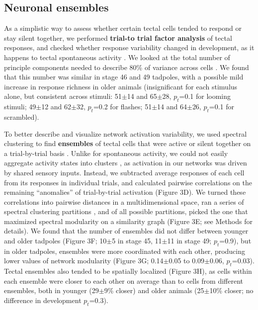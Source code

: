 \documentclass{article}
\begin{document}
\subsection*{Neuronal ensembles}

As a simplistic way to assess whether certain tectal cells tended to respond or stay silent together, we performed \textbf{trial-to trial factor analysis} of tectal responses, and checked whether response variability changed in development, as it happens to tectal spontaneous activity \citep{xu2011}. We looked at the total number of principle components needed to describe 80\% of variance across cells \citep{avitan2017spontaneous}. We found that this number was similar in stage 46 and 49 tadpoles, with a possible mild increase in response richness in older animals (insignificant for each stimulus alone, but consistent across stimuli: 51$\pm$14 and 65$\pm$28, $p_t$=0.1 for looming stimuli; 49$\pm$12 and 62$\pm$32, $p_t$=0.2 for flashes; 51$\pm$14 and 64$\pm$26, $p_t$=0.1 for scrambled).

To better describe and visualize network activation variability, we used spectral clustering to find \textbf{ensembles} of tectal cells that were active or silent together on a trial-by-trial basis \citep{thompson2016ensembles}. Unlike for spontaneous activity, we could not easily aggregate activity states into clusters \citep{avitan2017spontaneous}, as activation in our networks was driven by shared sensory inputs. Instead, we subtracted average responses of each cell from its responses in individual trials, and calculated pairwise correlations on the remaining “anomalies” of trial-by-trial activation (Figure 3D). We turned these correlations into pairwise distances in a multidimensional space, ran a series of spectral clustering partitions \citep{ng2002spectral}, and of all possible partitions, picked the one that maximized spectral modularity on a similarity graph \citep{newman2006modularity, gomez2009community} (Figure 3E; see Methods for details). We found that the number of ensembles did not differ between younger and older tadpoles (Figure 3F; 10$\pm$5 in stage 45, 11$\pm$11 in stage 49; $p_t$=0.9), but in older tadpoles, ensembles were more coordinated with each other,  producing lower values of network modularity (Figure 3G; 0.14$\pm$0.05 to 0.09$\pm$0.06, $p_t$=0.03). Tectal ensembles also tended to be spatially localized (Figure 3H), as cells within each ensemble were closer to each other on average than to cells from different ensembles, both in younger (29$\pm$9\% closer) and older animals (25$\pm$10\% closer; no difference in development $p_t$=0.3).
\end{document}
